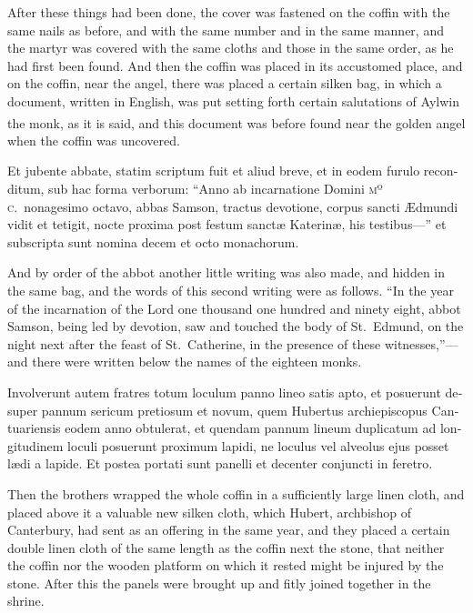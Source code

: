 \documentclass[10pt]{book}
\newcounter{engnote}
\newcommand{\engnotenum}{\textsuperscript{\arabic{engnote}\stepcounter{engnote}}}
\begin{document}
\begin{paracol}{2}
\switchcolumn

After these things had been done, the cover was fastened on the coffin with the same nails as before, and with the same number and in the same manner, and the martyr was covered with the same cloths and those in the same order, as he had first been found. And then the coffin was placed in its accustomed place, and on the coffin, near the angel, there was placed a certain silken bag, in which a document, written in English, was put setting forth certain salutations of Aylwin the monk,\engnotenum{} as it is said, and this document was before found near the golden angel when the coffin was uncovered.

\switchcolumn*

\begin{otherlanguage}{latin}
Et jubente abbate, statim scriptum fuit et aliud breve, et in eodem furulo reconditum, sub hac forma verborum: ``Anno ab incarnatione Domini \textsc{mº c}.\ nonagesimo octavo, abbas Samson, tractus devotione, corpus sancti \AE{}dmundi vidit et tetigit, nocte proxima post festum sanct\ae{} Katerin\ae{}, his testibus---'' et subscripta sunt nomina decem et octo monachorum. 
\end{otherlanguage}

\switchcolumn

And by order of the abbot another little writing was also made, and hidden in the same bag, and the words of this second writing were as follows. ``In the year of the incarnation of the Lord one thousand one hundred and ninety eight, abbot Samson, being led by devotion, saw and touched the body of St.\ Edmund, on the night next after the feast of St.\ Catherine, in the presence of these witnesses,''---and there were written below the names of the eighteen monks.

\switchcolumn*

\begin{otherlanguage}{latin}
Involverunt autem fratres totum loculum panno lineo satis apto, et posuerunt desuper pannum sericum pretiosum et novum, quem Hubertus archiepiscopus Cantuariensis eodem anno obtulerat, et quendam pannum lineum duplicatum ad longitudinem loculi posuerunt proximum lapidi, ne loculus vel alveolus ejus posset l\ae{}di a lapide. Et postea portati sunt panelli et decenter conjuncti in feretro. 
\end{otherlanguage}

\switchcolumn

Then the brothers wrapped the whole coffin in a sufficiently large linen cloth, and placed above it a valuable new silken cloth, which Hubert, archbishop of Canterbury, had sent as an offering in the same year, and they placed a certain double linen cloth of the same length as the coffin next the stone, that neither the coffin nor the wooden platform on which it rested might be injured by the stone. After this the panels were brought up and fitly joined together in the shrine.


\end{paracol}
\end{document}
